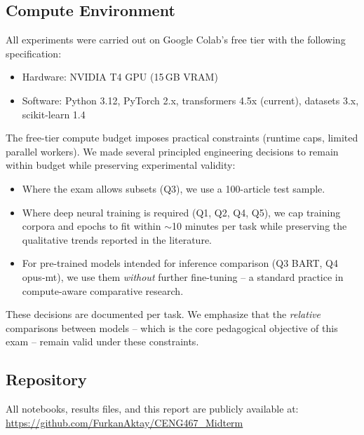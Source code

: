 \documentclass[11pt,a4paper]{article}
\begin{document}
\subsection{Compute Environment}

All experiments were carried out on Google Colab's free tier with the following specification:
\vspace{-0.4em}
\begin{itemize}[noitemsep,leftmargin=1.4em]
    \item Hardware: NVIDIA T4 GPU (15\,GB VRAM)
    \item Software: Python 3.12, PyTorch 2.x, transformers 4.5x (current), datasets 3.x, scikit-learn 1.4
\end{itemize}
\vspace{-0.4em}

The free-tier compute budget imposes practical constraints (runtime caps, limited parallel workers). We made several principled engineering decisions to remain within budget while preserving experimental validity:
\vspace{-0.4em}
\begin{itemize}[noitemsep,leftmargin=1.4em]
    \item Where the exam allows subsets (Q3), we use a 100-article test sample.
    \item Where deep neural training is required (Q1, Q2, Q4, Q5), we cap training corpora and epochs to fit within $\sim$10 minutes per task while preserving the qualitative trends reported in the literature.
    \item For pre-trained models intended for inference comparison (Q3 BART, Q4 opus-mt), we use them \emph{without} further fine-tuning -- a standard practice in compute-aware comparative research.
\end{itemize}
\vspace{-0.4em}

These decisions are documented per task. We emphasize that the \emph{relative} comparisons between models -- which is the core pedagogical objective of this exam -- remain valid under these constraints.

\subsection{Repository}

All notebooks, results files, and this report are publicly available at:\\
\url{https://github.com/FurkanAktay/CENG467_Midterm}
\end{document}
